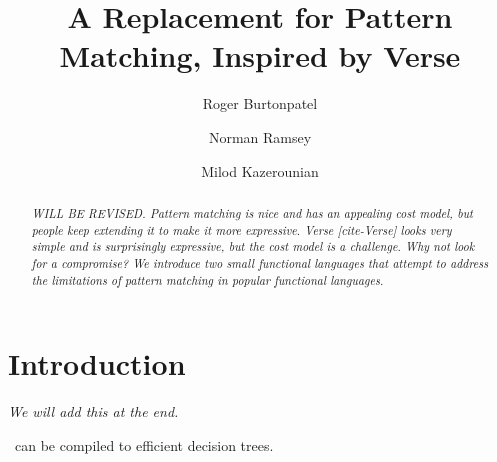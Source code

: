 \documentclass[manuscript,screen,review, 12pt]{acmart}
\begin{document}
\title{A Replacement for Pattern Matching, Inspired by Verse}

\author{Roger Burtonpatel}

\author{Norman Ramsey}

\author{Milod Kazerounian}

\renewcommand{\shortauthors}{Burtonpatel et al.}

\begin{abstract}
    \it{WILL BE REVISED.}
  Pattern matching is nice and has an appealing cost model, but people keep
  extending it to make it more expressive. Verse [cite-Verse] looks very simple
  and is surprisingly expressive, but the cost model is a challenge. Why not
  look for a compromise? We introduce two small functional languages that
  attempt to address the limitations of pattern matching in popular functional
  languages.
  \end{abstract}

\maketitle

\section{Introduction}
\it{We will add this at the end.}

\VMinus\ can be compiled to efficient decision trees. 
\end{document}
